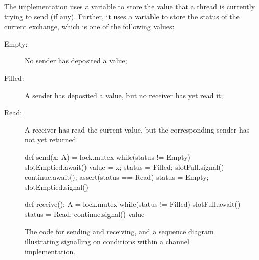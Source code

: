 The implementation uses a variable  to store the value that a
thread is currently trying to send (if any).  Further, it uses a variable
 to store the status of the current exchange, which is one of
the following values:
%
\begin{description}
\item[{\scalastyle Empty}:] No sender has deposited a value;
\item[{\scalastyle Filled}:] A sender has deposited a value, but no receiver
  has yet read it;
\item[{\scalastyle Read}:] A receiver has read the current value, but the
  corresponding sender has not yet returned.
\end{description}
%


\begin{figure}
\begin{minipage}[t]{80mm}
\begin{scala}
def send(x: A) = lock.mutex{
  while(status != Empty) slotEmptied.await()
  value = x; status = Filled; slotFull.signal()
  continue.await(); assert(status == Read)
  status = Empty; slotEmptied.signal()
}
\end{scala}
\end{minipage}
%
\begin{minipage}[t]{75mm}
\begin{scala}
def receive(): A = lock.mutex{
  while(status != Filled) slotFull.await()
  status = Read; continue.signal()
  value
}
\end{scala}
\end{minipage}


\begin{center}
\def\rx{3} %
\def\height{4}  %
\def\delta{0.8} %
\end{center}
\caption{The code for sending and receiving, and a sequence diagram
  illustrating signalling on conditions within a channel
  implementation. \label{fig:channel-sd}}
\end{figure}

